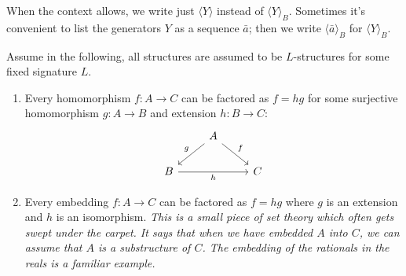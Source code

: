 When the context allows, we write just \( \langle Y \rangle \) instead of \( \langle Y \rangle_B \). Sometimes it’s convenient to list the generators \( Y \) as a sequence \( \bar{a} \); then we write \( \langle \bar{a} \rangle_B \) for \( \langle Y \rangle_B \).




\begin{proposition}
    \label{prop:homomorphism-factorization}

    Assume in the following, all structures are assumed to be \( L \)-structures for some fixed signature \( L \).
    \begin{enumerate}
        \item Every homomorphism \( f\colon A \to C \) can be factored as \( f = hg \) for some surjective homomorphism \( g\colon A \to B \) and extension \( h\colon B \to C \):
              \[
                  \begin{tikzcd}
                      & A \arrow[dr, "f"] \arrow[dl, "g"'] & \\
                      B \arrow[rr, "h"'] & & C
                  \end{tikzcd}
              \]
        \item Every embedding \( f\colon A \to C \) can be factored as \( f = hg \) where \( g \) is an extension and \( h \) is an isomorphism. \emph{This is a small piece of set theory which often gets swept under the carpet. It says that when we have embedded \( A \) into \( C \), we can assume that \( A \) is a substructure of \( C \). The embedding of the rationals in the reals is a familiar example.}
    \end{enumerate}
\end{proposition}



